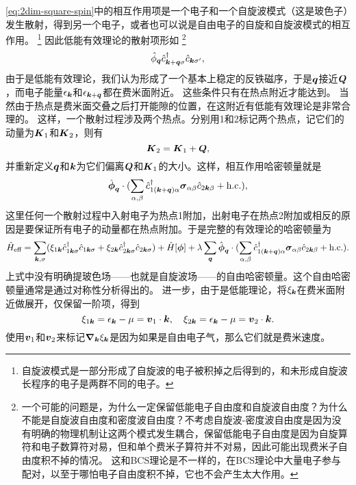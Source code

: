 \documentclass[hyperref, UTF8, a4paper]{ctexart}
\begin{document}
\eqref{eq:2dim-square-spin}中的相互作用项是一个电子和一个自旋波模式（这是玻色子）发生散射，得到另一个电子，或者也可以说是自由电子的自旋和自旋波模式的相互作用。%
\footnote{自旋波模式是一部分形成了自旋波的电子被积掉之后得到的，和未形成自旋波长程序的电子是两群不同的电子。}%
因此低能有效理论的散射项形如%
\footnote{一个可能的问题是，为什么一定保留低能电子自由度和自旋波自由度？为什么不能是自旋波自由度和密度波自由度？不考虑自旋波-密度波自由度是因为没有明确的物理机制让这两个模式发生耦合，保留低能电子自由度是因为自旋算符和电子数算符对易，但和单个费米子算符并不对易，因此可能出现费米子自由度积不掉的情况。
这和BCS理论是不一样的，在BCS理论中大量电子参与配对，以至于哪怕电子自由度积不掉，它也不会产生太大作用。}%
\[
    \hat{\phi}_{\vb*{q}} \hat{c}^\dagger_{\vb*{k}+\vb*{q}\sigma} \hat{c}_{\vb*{k}\sigma'},
\]
由于是低能有效理论，我们认为形成了一个基本上稳定的反铁磁序，于是$\vb*{q}$接近$\vb*{Q}$，而电子能量$\epsilon_{\vb*{k}}$和$\epsilon_{\vb*{k}+\vb*{q}}$都在费米面附近。
这些条件只有在热点附近才能达到。
当然由于热点是费米面交叠之后打开能隙的位置，在这附近有低能有效理论是非常合理的。
这样，一个散射过程涉及两个热点。分别用1和2标记两个热点，记它们的动量为$\vb*{K}_1$和$\vb*{K}_2$，则有
\[
    \vb*{K}_2 = \vb*{K}_1 + \vb*{Q},
\]
并重新定义$\vb*{q}$和$\vb*{k}$为它们偏离$\vb*{Q}$和$\vb*{K}_1$的大小。这样，相互作用哈密顿量就是
\[
    \hat{\vb*{\phi}}_{\vb*{q}} \cdot (\sum_{\alpha, \beta} \hat{c}^\dagger_{1(\vb*{k} + \vb*{q})\alpha} \vb*{\sigma}_{\alpha \beta} \hat{c}_{2\vb*{k} \beta} + \text{h.c.}),
\]
这里任何一个散射过程中入射电子为热点1附加，出射电子在热点2附加或相反的原因是要保证所有电子的动量都在热点附加。于是完整的有效理论的哈密顿量为
\begin{equation}
    \hat{H}_\text{eff} = \sum_{\vb*{k}, \sigma} (\xi_{1\vb*{k}} \hat{c}^\dagger_{1\vb*{k} \sigma} \hat{c}_{1 \vb*{k} \sigma} + \xi_{2\vb*{k}} \hat{c}^\dagger_{2\vb*{k} \sigma} \hat{c}_{2 \vb*{k} \sigma}) + \hat{H}[\vb*{\phi}] + \lambda \sum_{\vb*{q}} \hat{\vb*{\phi}}_{\vb*{q}} \cdot (\sum_{\alpha, \beta} \hat{c}^\dagger_{1(\vb*{k} + \vb*{q})\alpha} \vb*{\sigma}_{\alpha \beta} \hat{c}_{2\vb*{k} \beta} + \text{h.c.}).
    \label{eq:2dim-square-spin-eff}
\end{equation}
上式中没有明确提玻色场——也就是自旋波场——的自由哈密顿量。这个自由哈密顿量通常是通过对称性分析得出的。
进一步，由于是低能理论，将$\xi_{\vb*{k}}$在费米面附近做展开，仅保留一阶项，得到
\begin{equation}
    \xi_{1\vb*{k}} = \epsilon_{\vb*{k}} - \mu = \vb*{v}_1 \cdot \vb*{k}, \quad \xi_{2\vb*{k}} = \epsilon_{\vb*{k}} - \mu = \vb*{v}_2 \cdot \vb*{k}.
\end{equation}
使用$\vb*{v}_1$和$\vb*{v}_2$来标记$\grad_{\vb*{k}}{\xi_{\vb*{k}}}$是因为如果是自由电子气，那么它们就是费米速度。
\end{document}

